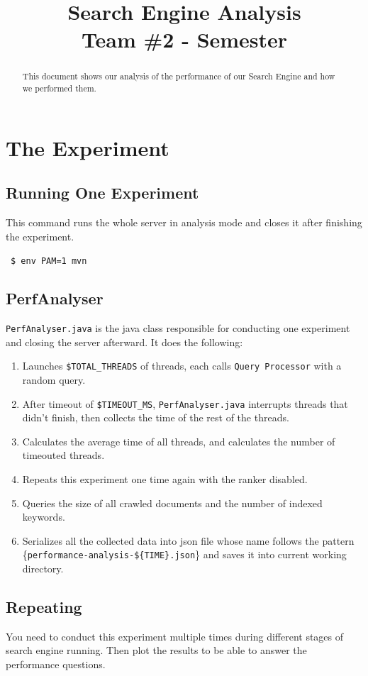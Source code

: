 \documentclass[12pt]{IEEEtran}
\title{\textbf{Search Engine Analysis}\\Team \#2 - Semester}
\date{}
\begin{document}

\maketitle

\begin{abstract}
  This document shows our analysis of the performance of our Search Engine and how we performed them.
\end{abstract}

\section{The Experiment}
\subsection{Running One Experiment}
This command runs the whole server in analysis mode and closes it after finishing the experiment. 

~\texttt{\$ env PAM=1 mvn}

\subsection{PerfAnalyser}
\texttt{PerfAnalyser.java} is the java class responsible for conducting one experiment and closing the server afterward. 
It does the following:
\begin{enumerate}
  \item Launches \small\texttt{\$TOTAL\_THREADS} of threads, each calls \small\texttt{Query Processor} with a random query.
  \item After timeout of \small\texttt{\$TIMEOUT\_MS}, \small\texttt{PerfAnalyser.java} interrupts threads that didn't finish, then collects the time of the rest of the threads.
  \item Calculates the average time of all threads, and calculates the number of timeouted threads.
  \item Repeats this experiment one time again with the ranker disabled.
  \item Queries the size of all crawled documents and the number of indexed keywords.
  \item Serializes all the collected data into json file whose name follows the pattern \small\{\texttt{performance-analysis-\$\{TIME\}.json}\} and saves it into current working directory.
\end{enumerate}

\subsection{Repeating}
You need to conduct this experiment multiple times during different stages of search engine running. Then plot the results to be able to answer the performance questions.
\end{document}
